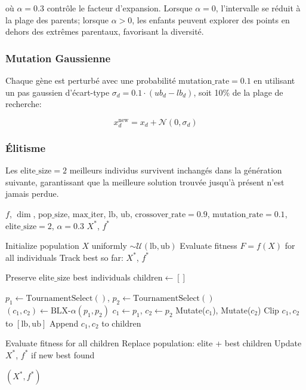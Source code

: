 \documentclass[12pt,a4paper,oneside]{report}
\begin{document}
o\`u $\alpha = 0.3$ contr\^ole le facteur d'expansion. Lorsque $\alpha = 0$, l'intervalle se r\'eduit \`a la plage des parents; lorsque $\alpha > 0$, les enfants peuvent explorer des points en dehors des extr\^emes parentaux, favorisant la diversit\'e.

\subsubsection{Mutation Gaussienne}

Chaque g\`ene est perturb\'e avec une probabilit\'e $\text{mutation\_rate} = 0.1$ en utilisant un pas gaussien d'\'ecart-type $\sigma_d = 0.1 \cdot (ub_d - lb_d)$, soit 10\% de la plage de recherche:

\begin{equation}
x_d^{\text{new}} = x_d + \mathcal{N}(0, \sigma_d)
\end{equation}

\subsubsection{\'Elitisme}

Les $\text{elite\_size} = 2$ meilleurs individus survivent inchang\'es dans la g\'en\'eration suivante, garantissant que la meilleure solution trouv\'ee jusqu'\`a pr\'esent n'est jamais perdue.

\begin{algorithm}[H]
\caption{Algorithme G\'en\'etique (Codage R\'eel)}
\begin{algorithmic}[1]
\Require $f$, $\dim$, $\text{pop\_size}$, $\text{max\_iter}$, $\text{lb}$, $\text{ub}$, $\text{crossover\_rate}=0.9$, $\text{mutation\_rate}=0.1$, $\text{elite\_size}=2$, $\alpha=0.3$
\Ensure $X^*$, $f^*$

\State Initialize population $X$ uniformly $\sim \mathcal{U}(\text{lb}, \text{ub})$
\State Evaluate fitness $F = f(X)$ for all individuals
\State Track best so far: $X^*$, $f^*$

    \State Preserve $\text{elite\_size}$ best individuals
    \State $\text{children} \gets []$

        \State $p_1 \gets \text{TournamentSelect}()$, $p_2 \gets \text{TournamentSelect}()$
            \State $(c_1, c_2) \gets \text{BLX-}\alpha(p_1, p_2)$
        \Else
            \State $c_1 \gets p_1$, $c_2 \gets p_2$
        \EndIf
        \State Mutate($c_1$), Mutate($c_2$)
        \State Clip $c_1, c_2$ to $[\text{lb}, \text{ub}]$
        \State Append $c_1, c_2$ to $\text{children}$
    \EndWhile

    \State Evaluate fitness for all children
    \State Replace population: elite + best children
    \State Update $X^*$, $f^*$ if new best found
\EndFor

\State \Return $(X^*, f^*)$
\end{algorithmic}
\end{algorithm}
\end{document}
